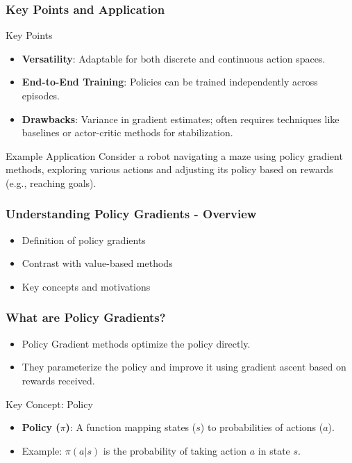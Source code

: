 \documentclass[aspectratio=169]{beamer}
\begin{document}
\begin{frame}[fragile]
    \frametitle{Key Points and Application}
    \begin{block}{Key Points}
        \begin{itemize}
            \item \textbf{Versatility}: Adaptable for both discrete and continuous action spaces.
            \item \textbf{End-to-End Training}: Policies can be trained independently across episodes.
            \item \textbf{Drawbacks}: Variance in gradient estimates; often requires techniques like baselines or actor-critic methods for stabilization.
        \end{itemize}
    \end{block}
    
    \begin{block}{Example Application}
        Consider a robot navigating a maze using policy gradient methods, exploring various actions and adjusting its policy based on rewards (e.g., reaching goals).
    \end{block}
\end{frame}

\begin{frame}[fragile]
    \frametitle{Understanding Policy Gradients - Overview}
    \begin{itemize}
        \item Definition of policy gradients
        \item Contrast with value-based methods
        \item Key concepts and motivations
    \end{itemize}
\end{frame}

\begin{frame}[fragile]
    \frametitle{What are Policy Gradients?}
    \begin{itemize}
        \item Policy Gradient methods optimize the policy directly.
        \item They parameterize the policy and improve it using gradient ascent based on rewards received.
    \end{itemize}
    \begin{block}{Key Concept: Policy}
        \begin{itemize}
            \item \textbf{Policy ($\pi$)}: A function mapping states ($s$) to probabilities of actions ($a$).
            \item Example: $\pi(a|s)$ is the probability of taking action $a$ in state $s$.
        \end{itemize}
    \end{block}
\end{frame}
\end{document}
